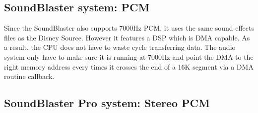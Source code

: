 \par
\subsection{SoundBlaster system: PCM}
Since the SoundBlaster also supports 7000Hz PCM, it uses the same sound effects files as the Disney Source. However it features a DSP which is DMA capable. As a result, the CPU does not have to waste cycle transferring data. The audio system only have to make sure it is running at 7000Hz and point the DMA to the right memory address every times it crosses the end of a 16K segment via a DMA routine callback.
\par








\par
\subsection{SoundBlaster Pro system: Stereo PCM}
\par

